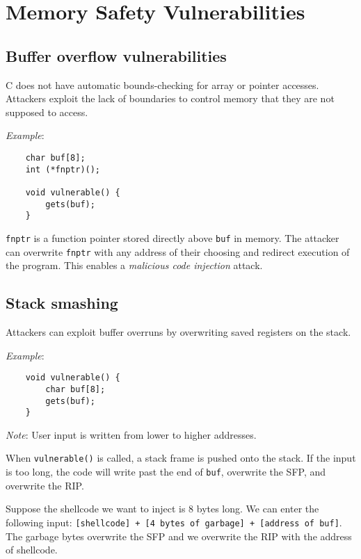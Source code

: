 \chapter{Memory Safety Vulnerabilities}

\section{Buffer overflow vulnerabilities}
C does not have automatic bounds-checking for array or pointer accesses. Attackers exploit the lack of boundaries to control memory that they are not supposed to access.

\medskip

\emph{Example}:

\begin{verbatim}
    char buf[8];
    int (*fnptr)();
    
    void vulnerable() {
        gets(buf);
    }
\end{verbatim}

\texttt{fnptr} is a function pointer stored directly above \texttt{buf} in memory. The attacker can overwrite \texttt{fnptr} with any address of their choosing and redirect execution of the program. This enables a \emph{malicious code injection} attack.

\section{Stack smashing}
Attackers can exploit buffer overruns by overwriting saved registers on the stack.

\medskip

\emph{Example}:

\begin{verbatim}
    void vulnerable() {
        char buf[8];
        gets(buf);
    }
\end{verbatim}

\emph{Note}: User input is written from lower to higher addresses.

\medskip

When \texttt{vulnerable()} is called, a stack frame is pushed onto the stack. If the input is too long, the code will write past the end of \texttt{buf}, overwrite the SFP, and overwrite the RIP.

\medskip

Suppose the shellcode we want to inject is 8 bytes long. We can enter the following input: \texttt{[shellcode] + [4 bytes of garbage] + [address of buf]}. The garbage bytes overwrite the SFP and we overwrite the RIP with the address of shellcode.

